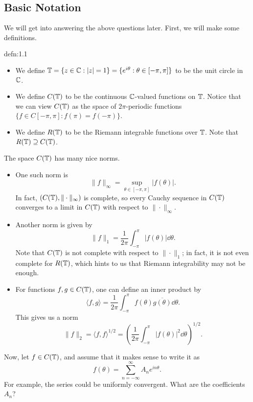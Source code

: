 \subsection{Basic Notation}
We will get into answering the above questions later. First, we will make 
some definitions.

\begin{defn}{defn:1.1}
    \begin{itemize}
        \item We define $\mathbb{T} = \{z \in \mathbb{C} : |z| = 1\} = 
        \{e^{i\theta} : \theta \in [-\pi, \pi]\}$ to be the unit circle in $\mathbb{C}$. 
        \item We define $C(\mathbb{T})$ to be the continuous $\mathbb{C}$-valued functions 
        on $\mathbb{T}$. Notice that we can view $C(\mathbb{T})$ as the space of
        $2\pi$-periodic functions $\{f \in C[-\pi, \pi] : f(\pi) = f(-\pi)\}$.
        \item We define $R(\mathbb{T})$ to be the Riemann integrable functions 
        over $\mathbb{T}$. Note that $R(\mathbb{T}) \supseteq C(\mathbb{T})$. 
    \end{itemize}
\end{defn}

The space $C(\mathbb{T})$ has many nice norms. 
\begin{itemize}
    \item One such norm is 
    \[ \|f\|_\infty = \sup_{\theta \in [-\pi, \pi]} |f(\theta)|. \] 
    In fact, $(C(\mathbb{T}), \|\cdot\|_\infty)$ is complete, so every 
    Cauchy sequence in $C(\mathbb{T})$ converges to a limit in $C(\mathbb{T})$ with respect to 
    $\|\cdot\|_\infty$.
    \item Another norm is given by 
    \[ \|f\|_1 = \frac{1}{2\pi} \int_{-\pi}^\pi |f(\theta)|\dd\theta. \] 
    Note that $C(\mathbb{T})$ is not complete with respect to $\|\cdot\|_1$; 
    in fact, it is not even complete for $R(\mathbb{T})$, which hints to us that 
    Riemann integrability may not be enough. 
    \item For functions $f, g \in C(\mathbb{T})$, one can define an inner product by 
    \[ \langle f, g \rangle = \frac{1}{2\pi} \int_{-\pi}^\pi f(\theta) 
    \overline{g(\theta)}\dd\theta. \] 
    This gives us a norm 
    \[ \|f\|_2 = \langle f, f \rangle^{1/2} = 
    \left( \frac{1}{2\pi} \int_{-\pi}^\pi |f(\theta)|^2\dd\theta \right)^{\!1/2}. \] 
\end{itemize} 
Now, let $f \in C(\mathbb{T})$, and assume that it makes sense to write it as 
\[ f(\theta) = \sum_{n=-\infty}^\infty A_n e^{in\theta}. \] 
For example, the series could be uniformly convergent. What are the 
coefficients $A_n$?

